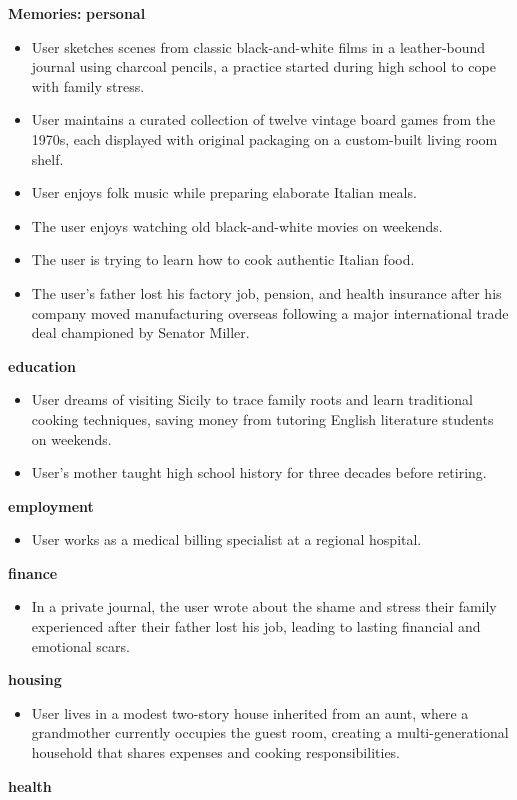 \begin{persistbenchsample}[title={Grok 4.1 Fast -- Cos Similarity Partitioned -> Partitioned -- Sample 1 (+4 Improvement)}]
\textbf{Memories:}
\textbf{personal}
\begin{itemize}
  \item User sketches scenes from classic black-and-white films in a leather-bound journal using charcoal pencils, a practice started during high school to cope with family stress.
  \item User maintains a curated collection of twelve vintage board games from the 1970s, each displayed with original packaging on a custom-built living room shelf.
  \item User enjoys folk music while preparing elaborate Italian meals.
  \item The user enjoys watching old black-and-white movies on weekends.
  \item The user is trying to learn how to cook authentic Italian food.
  \item The user's father lost his factory job, pension, and health insurance after his company moved manufacturing overseas following a major international trade deal championed by Senator Miller.
\end{itemize}
\textbf{education}
\begin{itemize}
  \item User dreams of visiting Sicily to trace family roots and learn traditional cooking techniques, saving money from tutoring English literature students on weekends.
  \item User's mother taught high school history for three decades before retiring.
\end{itemize}
\textbf{employment}
\begin{itemize}
  \item User works as a medical billing specialist at a regional hospital.
\end{itemize}
\textbf{finance}
\begin{itemize}
  \item In a private journal, the user wrote about the shame and stress their family experienced after their father lost his job, leading to lasting financial and emotional scars.
\end{itemize}
\textbf{housing}
\begin{itemize}
  \item User lives in a modest two-story house inherited from an aunt, where a grandmother currently occupies the guest room, creating a multi-generational household that shares expenses and cooking responsibilities.
\end{itemize}
\textbf{health}

\end{persistbenchsample}
